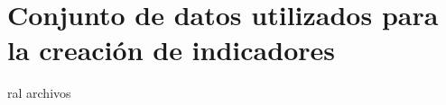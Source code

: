 \section{Conjunto de datos utilizados para la creación de indicadores}
\label{an:conjuntodedatos}

ral archivos
\label{an:Cral}
